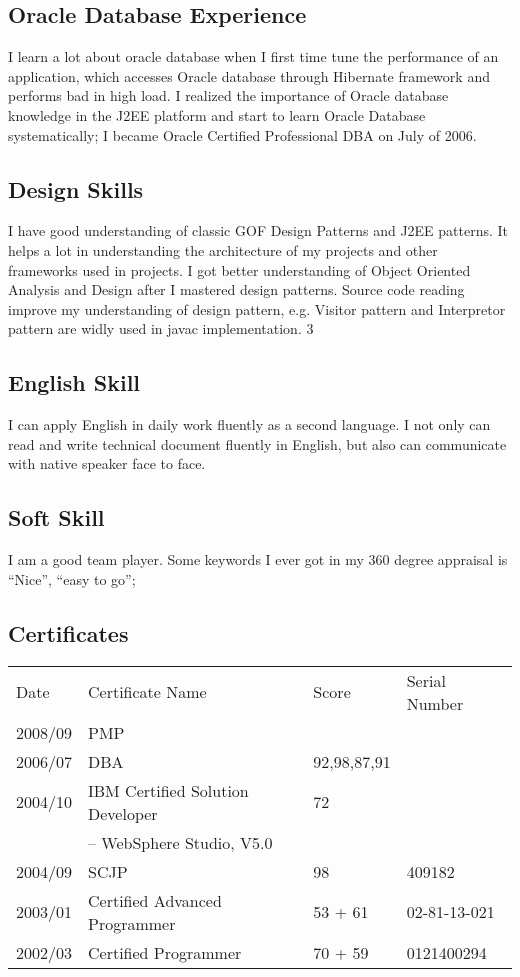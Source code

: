 \documentclass[a4paper,12pt]{article}
\begin{document}
\subsection{Oracle Database Experience}
I learn a lot about oracle database when I first time tune the performance of an application, which accesses Oracle database through Hibernate framework and performs bad in high load. I realized the importance of Oracle database knowledge in the J2EE platform and start to learn Oracle Database systematically; I became Oracle Certified Professional DBA on July of 2006. 

\subsection{Design Skills}
I have good understanding of classic GOF Design Patterns and J2EE patterns. It helps a lot in understanding the architecture of my projects and other frameworks used in projects. I got better understanding of Object Oriented Analysis and Design after I mastered design patterns. Source code reading improve my understanding of design pattern, e.g. Visitor pattern and Interpretor pattern are widly used in javac implementation.
3
    


\subsection{English Skill}
I can apply English in daily work fluently as a second language. I not only can read and write technical document fluently in English, but also can communicate with native speaker face to face.

\subsection{Soft Skill}
I am a good team player. Some keywords I ever got in my 360 degree appraisal is ``Nice'', ``easy to go''; 

\subsection{Certificates}
\begin{tabular}{llll}
Date        & Certificate Name                  & Score       & Serial Number\\
2008/09     & PMP\\
2006/07     & DBA                               & 92,98,87,91 & \\
2004/10     & IBM Certified Solution Developer  & 72          & \\
            & -- WebSphere Studio, V5.0         &             & \\
2004/09     & SCJP                              & 98          & 409182\\
2003/01     & Certified Advanced Programmer     & 53 + 61     & 02-81-13-021\\
2002/03     & Certified Programmer              & 70 + 59     & 0121400294\\
\end{tabular}
\end{document}
